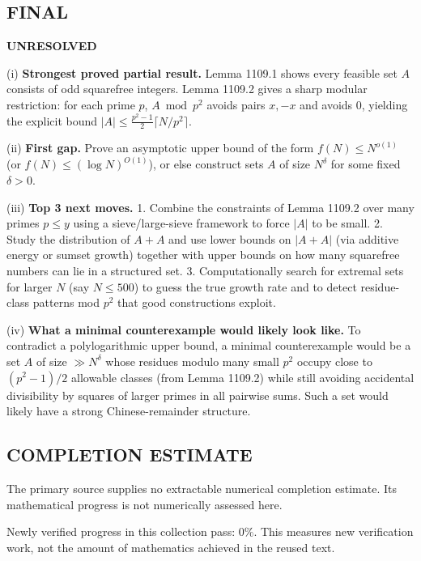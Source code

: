 \subsection*{FINAL}
\textbf{UNRESOLVED}

(i) \textbf{Strongest proved partial result.}
Lemma 1109.1 shows every feasible set $A$ consists of odd squarefree integers.
Lemma 1109.2 gives a sharp modular restriction: for each prime $p$, $A\bmod p^2$ avoids pairs $x,-x$ and avoids $0$, yielding the explicit bound
$|A|\le \frac{p^2-1}{2}\lceil N/p^2\rceil$.

(ii) \textbf{First gap.}
Prove an asymptotic upper bound of the form $f(N)\le N^{o(1)}$ (or $f(N)\le (\log N)^{O(1)}$), or else construct sets $A$ of size $N^{\delta}$ for some fixed $\delta>0$.

(iii) \textbf{Top 3 next moves.}
1. Combine the constraints of Lemma 1109.2 over many primes $p\le y$ using a sieve/large-sieve framework to force $|A|$ to be small.
2. Study the distribution of $A+A$ and use lower bounds on $|A+A|$ (via additive energy or sumset growth) together with upper bounds on how many squarefree numbers can lie in a structured set.
3. Computationally search for extremal sets for larger $N$ (say $N\le 500$) to guess the true growth rate and to detect residue-class patterns mod $p^2$ that good constructions exploit.

(iv) \textbf{What a minimal counterexample would likely look like.}
To contradict a polylogarithmic upper bound, a minimal counterexample would be a set $A$ of size $\gg N^{\delta}$ whose residues modulo many small $p^2$ occupy close to $(p^2-1)/2$ allowable classes (from Lemma 1109.2) while still avoiding accidental divisibility by squares of larger primes in all pairwise sums. Such a set would likely have a strong Chinese-remainder structure.




\subsection*{COMPLETION ESTIMATE}
The primary source supplies no extractable numerical completion estimate. Its mathematical progress is not numerically assessed here.

Newly verified progress in this collection pass: $0\%$. This measures new verification work, not the amount of mathematics achieved in the reused text.

